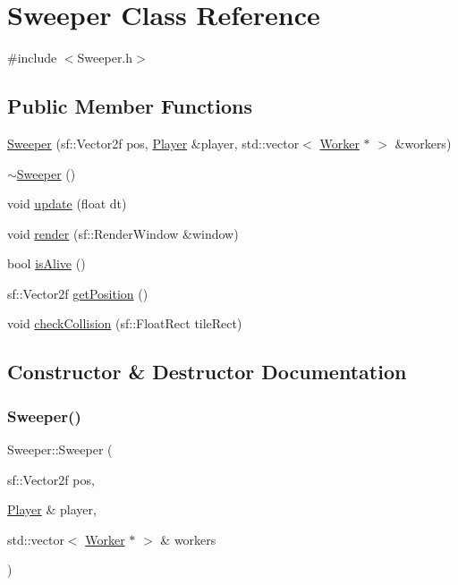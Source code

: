 \hypertarget{class_sweeper}{}\section{Sweeper Class Reference}
\label{class_sweeper}


{\ttfamily \#include $<$Sweeper.\+h$>$}

\subsection*{Public Member Functions}
\begin{DoxyCompactItemize}
\item 
\mbox{\hyperlink{class_sweeper_ab8b9b26429a540f9dc86e6b196d0885f}{Sweeper}} (sf\+::\+Vector2f pos, \mbox{\hyperlink{class_player}{Player}} \&player, std\+::vector$<$ \mbox{\hyperlink{class_worker}{Worker}} $\ast$ $>$ \&workers)
\item 
\mbox{\hyperlink{class_sweeper_a3099037dc68c87b680a8b235fb61848c}{$\sim$\+Sweeper}} ()
\item 
void \mbox{\hyperlink{class_sweeper_aa186e2bb4c00d8f00c6a947cfd7b4a08}{update}} (float dt)
\item 
void \mbox{\hyperlink{class_sweeper_a8308b5cec3c19e0292947081100d777b}{render}} (sf\+::\+Render\+Window \&window)
\item 
bool \mbox{\hyperlink{class_sweeper_a1fbc98affe3222dec0bb23f03dfe63e5}{is\+Alive}} ()
\item 
sf\+::\+Vector2f \mbox{\hyperlink{class_sweeper_a9fecea4436904ee3357a0b763f2c6c76}{get\+Position}} ()
\item 
void \mbox{\hyperlink{class_sweeper_a627463bc1a0a2bb5d1ba215a4b823d85}{check\+Collision}} (sf\+::\+Float\+Rect tile\+Rect)
\end{DoxyCompactItemize}


\subsection{Constructor \& Destructor Documentation}
\mbox{\label{class_sweeper_ab8b9b26429a540f9dc86e6b196d0885f}} 
\subsubsection{\texorpdfstring{Sweeper()}{Sweeper()}}
{\footnotesize\ttfamily Sweeper\+::\+Sweeper (\begin{DoxyParamCaption}\item[{sf\+::\+Vector2f}]{pos,  }\item[{\mbox{\hyperlink{class_player}{Player}} \&}]{player,  }\item[{std\+::vector$<$ \mbox{\hyperlink{class_worker}{Worker}} $\ast$ $>$ \&}]{workers }\end{DoxyParamCaption})}

